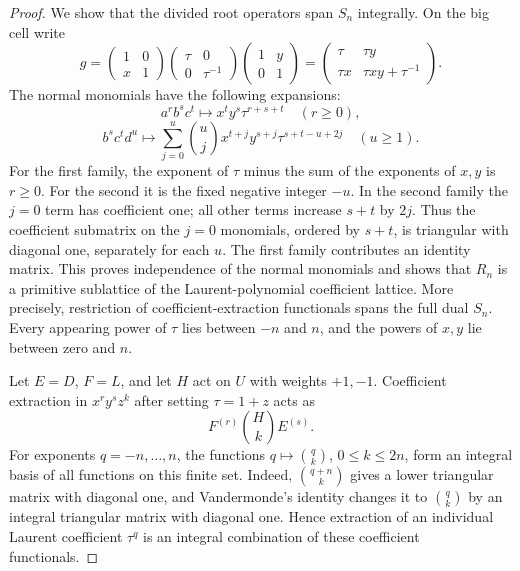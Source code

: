 \begin{proof}
We show that the divided root operators span $S_n$ integrally. On the
big cell write
\[
 g=\begin{pmatrix}1&0\\x&1\end{pmatrix}
   \begin{pmatrix}\tau&0\\0&\tau^{-1}\end{pmatrix}
   \begin{pmatrix}1&y\\0&1\end{pmatrix}
 =\begin{pmatrix}\tau&\tau y\\\tau x&\tau xy+\tau^{-1}\end{pmatrix}.
\]
The normal monomials have the following expansions:
\[
 a^r b^s c^t\mapsto x^t y^s\tau^{r+s+t}\quad(r\geq0),
\]
\[
 b^s c^t d^u\mapsto
 \sum_{j=0}^u\binom uj x^{t+j}y^{s+j}\tau^{s+t-u+2j}
 \quad(u\geq1).
\]
For the first family, the exponent of $\tau$ minus the sum of the
exponents of $x,y$ is $r\geq0$. For the second it is the fixed negative
integer $-u$. In the second family the $j=0$ term has coefficient one;
all other terms increase $s+t$ by $2j$. Thus the coefficient submatrix
on the $j=0$ monomials, ordered by $s+t$, is triangular with diagonal
one, separately for each $u$. The first family contributes an identity
matrix. This proves independence of the normal monomials and shows that
$R_n$ is a primitive sublattice of the Laurent-polynomial coefficient
lattice. More precisely, restriction of coefficient-extraction
functionals spans the full dual $S_n$. Every appearing power of
$\tau$ lies between $-n$ and $n$, and the powers of $x,y$ lie between
zero and $n$.

Let $E=D$, $F=L$, and let $H$ act on $U$ with weights $+1,-1$.
Coefficient extraction in $x^r y^s z^k$ after setting $\tau=1+z$
acts as
\[
 F^{(r)}\binom Hk E^{(s)}.
\]
For exponents $q=-n,\ldots,n$, the functions $q\mapsto\binom qk$,
$0\leq k\leq2n$, form an integral basis of all functions on this finite
set. Indeed, $\binom{q+n}{k}$ gives a lower triangular matrix with
diagonal one, and Vandermonde's identity changes it to $\binom qk$
by an integral triangular matrix with diagonal one. Hence extraction of
an individual Laurent coefficient $\tau^q$ is an integral combination
of these coefficient functionals.


\end{proof}
